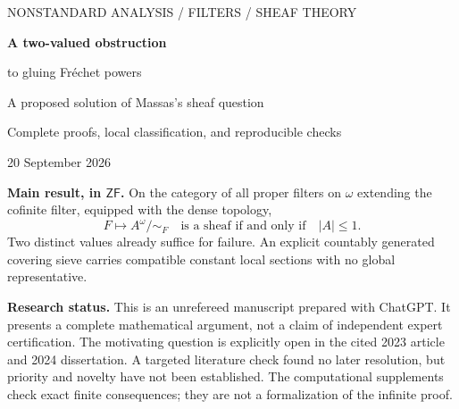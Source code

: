 \documentclass[11pt,letterpaper]{article}
\theoremstyle{definition}
\theoremstyle{remark}
\newcommand{\om}{\omega}
\newcommand{\ZF}{\mathsf{ZF}}
\begin{document}
\begin{titlepage}
\thispagestyle{empty}
\vspace*{0.6in}
{\sffamily\color{accent}\large NONSTANDARD ANALYSIS \; / \; FILTERS \; / \; SHEAF THEORY\par}
\vspace{0.45in}
{\Huge\bfseries A two-valued obstruction\par to gluing Fr\'echet powers\par}
\vspace{0.3in}
{\LARGE\color{muted}A proposed solution of Massas's sheaf question\par}
\vspace{0.5in}
{\large Complete proofs, local classification, and reproducible checks\par}
\vspace{0.25in}
{\large 20 September 2026\par}
\vspace{0.45in}
\begin{resultbox}
\textbf{Main result, in $\ZF$.} On the category of all proper filters on
$\om$ extending the cofinite filter, equipped with the dense topology,
\[
  F\longmapsto A^\om/{\sim_F}
  \quad\text{is a sheaf if and only if}\quad |A|\leq 1.
\]
Two distinct values already suffice for failure. An explicit countably
generated covering sieve carries compatible constant local sections with
no global representative.
\end{resultbox}
\vfill
\noindent\textbf{Research status.} This is an unrefereed manuscript prepared
with ChatGPT. It presents a complete mathematical argument, not a claim of
independent expert certification. The motivating question is explicitly open
in the cited 2023 article and 2024 dissertation. A targeted literature check
found no later resolution, but priority and novelty have not been established.
The computational supplements check exact finite consequences; they are not a
formalization of the infinite proof.
\end{titlepage}
\end{document}
